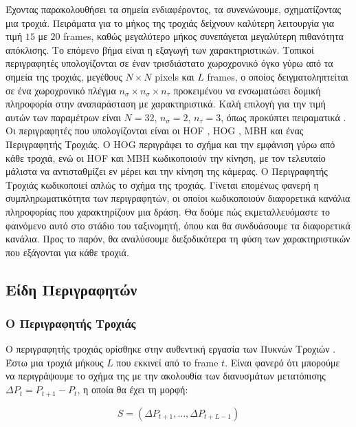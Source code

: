 \documentclass[11pt,a4paper,english,greek,twoside]{../Thesis}
\begin{document}
\par Έχοντας παρακολουθήσει τα σημεία ενδιαφέροντος, τα συνενώνουμε, σχηματίζοντας μια τροχιά. Πειράματα \cite{wang_2011} για το μήκος της τροχιάς δείχνουν καλύτερη λειτουργία για τιμή $15$ με $20$ frames, καθώς μεγαλύτερο μήκος συνεπάγεται μεγαλύτερη πιθανότητα απόκλισης. Το επόμενο βήμα είναι η εξαγωγή των χαρακτηριστικών. Τοπικοί περιγραφητές υπολογίζονται σε έναν τρισδιάστατο χωροχρονικό όγκο γύρω από τα σημεία της τροχιάς, μεγέθους $N \times N$ pixels και $L$ frames, ο οποίος δειγματοληπτείται σε ένα χωροχρονικό πλέγμα $n_{\sigma} \times n_{\sigma} \times n_{\tau}$ προκειμένου να ενσωματώσει δομική πληροφορία στην αναπαράσταση με χαρακτηριστικά. Καλή επιλογή για την τιμή αυτών των παραμέτρων είναι $N=32$, $n_{\sigma}=2$, $n_{\tau}=3$, όπως προκύπτει πειραματικά \cite{wang_2011}. Οι περιγραφητές που υπολογίζονται είναι οι HOF \cite{laptev_2008}, HOG \cite{dalal_2005}, MBH \cite{dalal_2006} και ένας Περιγραφητής Τροχιάς. Ο HΟG περιγράφει το σχήμα και την εμφάνιση γύρω από κάθε τροχιά, ενώ οι HΟF και MBH κωδικοποιούν την κίνηση, με τον τελευταίο μάλιστα να αντισταθμίζει εν μέρει και την κίνηση της κάμερας. Ο Περιγραφητής Τροχιάς κωδικοποιεί απλώς το σχήμα της τροχιάς. Γίνεται επομένως φανερή η συμπληρωματικότητα των περιγραφητών, οι οποίοι κωδικοποιούν διαφορετικά κανάλια πληροφορίας που χαρακτηρίζουν μια δράση. Θα δούμε πώς εκμεταλλευόμαστε το φαινόμενο αυτό στο στάδιο του ταξινομητή, όπου και θα συνδυάσουμε τα διαφορετικά κανάλια. Προς το παρόν, θα αναλύσουμε διεξοδικότερα τη φύση των χαρακτηριστικών που εξάγονται για κάθε τροχιά.


\subsection{Είδη Περιγραφητών}

\subsubsection{Ο Περιγραφητής Τροχιάς}
Ο περιγραφητής τροχιάς ορίσθηκε στην αυθεντική εργασία των Πυκνών Τροχιών \cite{wang_2011}. Έστω μια τροχιά μήκους $L$ που εκκινεί από το frame $t$. Είναι φανερό ότι μπορούμε να περιγράψουμε το σχήμα της με την ακολουθία των διανυσμάτων μετατόπισης $\Delta P_t=P_{t+1}-P_t$, η οποία θα έχει τη μορφή:

\begin{equation}\label{eq:trajDense}
    S=(\Delta P_{t+1}, \dots ,\Delta P_{t+L-1})
\end{equation}
\end{document}
